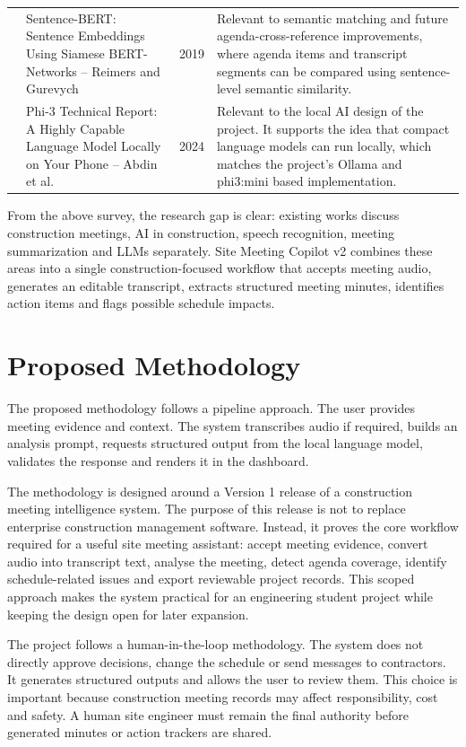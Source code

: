 \documentclass[11pt,a4paper]{article}
\begin{document}
\begin{longtable}{p{0.9cm}p{5.0cm}p{1.1cm}p{5.4cm}}
\cite{sbert} & Sentence-BERT: Sentence Embeddings Using Siamese BERT-Networks -- Reimers and Gurevych & 2019 & Relevant to semantic matching and future agenda-cross-reference improvements, where agenda items and transcript segments can be compared using sentence-level semantic similarity. \\

\cite{phi3} & Phi-3 Technical Report: A Highly Capable Language Model Locally on Your Phone -- Abdin et al. & 2024 & Relevant to the local AI design of the project. It supports the idea that compact language models can run locally, which matches the project's Ollama and phi3:mini based implementation. \\
\bottomrule
\end{longtable}
\endgroup

From the above survey, the research gap is clear: existing works discuss construction meetings, AI in construction, speech recognition, meeting summarization and LLMs separately. Site Meeting Copilot v2 combines these areas into a single construction-focused workflow that accepts meeting audio, generates an editable transcript, extracts structured meeting minutes, identifies action items and flags possible schedule impacts.

\section{Proposed Methodology}

The proposed methodology follows a pipeline approach. The user provides meeting evidence and context. The system transcribes audio if required, builds an analysis prompt, requests structured output from the local language model, validates the response and renders it in the dashboard.

The methodology is designed around a Version 1 release of a construction meeting intelligence system. The purpose of this release is not to replace enterprise construction management software. Instead, it proves the core workflow required for a useful site meeting assistant: accept meeting evidence, convert audio into transcript text, analyse the meeting, detect agenda coverage, identify schedule-related issues and export reviewable project records. This scoped approach makes the system practical for an engineering student project while keeping the design open for later expansion.

The project follows a human-in-the-loop methodology. The system does not directly approve decisions, change the schedule or send messages to contractors. It generates structured outputs and allows the user to review them. This choice is important because construction meeting records may affect responsibility, cost and safety. A human site engineer must remain the final authority before generated minutes or action trackers are shared.
\end{document}
